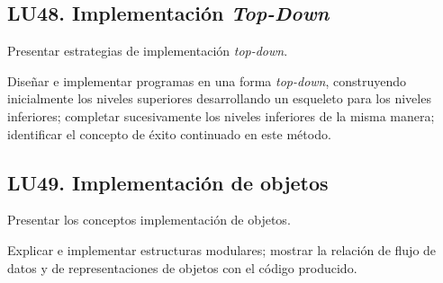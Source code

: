 \subsection{LU48. Implementación \textit{Top-Down}}\label{sec:BOK-LU48}\label{sec:LU48}
\begin{LearningUnit}
\begin{LUGoal}
\item Presentar estrategias de implementación \textit{top-down}.
\end{LUGoal}

\begin{LUObjective}
\item Diseñar e implementar programas en una forma \textit{top-down}, construyendo inicialmente los niveles superiores desarrollando un esqueleto para los niveles inferiores; completar sucesivamente los niveles inferiores de la misma manera; identificar el concepto de éxito continuado en este método.
\end{LUObjective}
\end{LearningUnit}

\subsection{LU49. Implementación de objetos}\label{sec:BOK-LU49}\label{sec:LU49}
\begin{LearningUnit}
\begin{LUGoal}
\item Presentar los conceptos implementación de objetos.
\end{LUGoal}

\begin{LUObjective}
\item Explicar e implementar estructuras modulares; mostrar la relación de flujo de datos y de representaciones de objetos con el código producido.
\end{LUObjective}
\end{LearningUnit}

